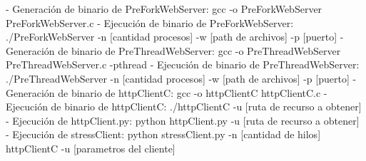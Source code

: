 \documentclass{report}
\begin{document}
- Generaci\'on de binario de PreForkWebServer: \newline
gcc -o PreForkWebServer PreForkWebServer.c\newline
\newline
- Ejecuci\'on de binario de PreForkWebServer: \newline
./PreForkWebServer -n [cantidad procesos] -w [path de archivos] -p [puerto]\newline
\newline
- Generaci\'on de binario de PreThreadWebServer: \newline
gcc -o PreThreadWebServer PreThreadWebServer.c -pthread\newline
\newline
- Ejecuci\'on de binario de PreThreadWebServer: \newline
./PreThreadWebServer -n [cantidad procesos] -w [path de archivos] -p [puerto]\newline
\newline
- Generaci\'on de binario de httpClientC: \newline
gcc -o httpClientC httpClientC.c\newline
\newline
- Ejecuci\'on de binario de httpClientC: \newline
./httpClientC -u [ruta de recurso a obtener]\newline
\newline
- Ejecuci\'on de httpClient.py: \newline
python httpClient.py -u [ruta de recurso a obtener]\newline
\newline
- Ejecuci\'on de stressClient: \newline
python stressClient.py -n [cantidad de hilos] httpClientC -u [parametros del cliente]\newline
\newline
\newpage
\end{document}
